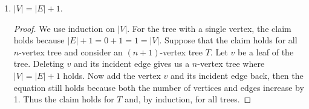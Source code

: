 \documentclass[11pt]{article}
\begin{document}
\begin{enumerate}
\begin{enumerate}
\begin{proof}
        contain at least one edge. There cannot be an edge between
        $v_1$ and $v_i$ for $2 < i \leq m$, because otherwise
        $v_1 \cdots v_i$ would form a cycle. There cannot also be an
        edge between $v_1$ and $u$ for some vertex $u$ that is not on
        the path, because otherwise the path would be
        longer. Therefore the only edge incident to $v_1$ is $(v_1,
        v_2)$, which means that $v_1$ is a leaf. By a symmetric
        argument, $v_m$ is also a leaf.
      \end{proof}
    \item $|V| = |E| + 1$.
      \begin{proof}
        We use induction on $|V|$. For the tree with a single vertex,
        the claim holds because $|E|+1=0+1=1=|V|$. Suppose that the
        claim holds for all $n$-vertex tree and consider an
        $(n+1)$-vertex tree $T$. Let $v$ be a leaf of the tree. Deleting
        $v$ and its incident edge gives us a $n$-vertex tree where
        $|V|=|E|+1$ holds. Now add the vertex $v$ and its incident
        edge back, then the equation still holds because both the
        number of vertices and edges increase by 1. Thus the claim
        holds for $T$ and, by induction, for all trees.
      \end{proof}
    \end{enumerate}
\end{enumerate}
\end{document}

